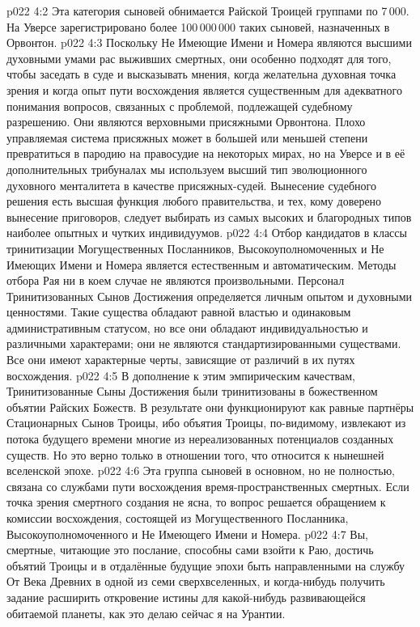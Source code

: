\vs p022 4:2 Эта категория сыновей обнимается Райской Троицей группами по 7\,000. На Уверсе зарегистрировано более 100\,000\,000 таких сыновей, назначенных в Орвонтон.
\vs p022 4:3 Поскольку Не Имеющие Имени и Номера являются высшими духовными умами рас выживших смертных, они особенно подходят для того, чтобы заседать в суде и высказывать мнения, когда желательна духовная точка зрения и когда опыт пути восхождения является существенным для адекватного понимания вопросов, связанных с проблемой, подлежащей судебному разрешению. Они являются верховными присяжными Орвонтона. Плохо управляемая система присяжных может в большей или меньшей степени превратиться в пародию на правосудие на некоторых мирах, но на Уверсе и в её дополнительных трибуналах мы используем высший тип эволюционного духовного менталитета в качестве присяжных\hyp{}судей. Вынесение судебного решения есть высшая функция любого правительства, и тех, кому доверено вынесение приговоров, следует выбирать из самых высоких и благородных типов наиболее опытных и чутких индивидуумов.
\vs p022 4:4 \pc Отбор кандидатов в классы тринитизации Могущественных Посланников, Высокоуполномоченных и Не Имеющих Имени и Номера является естественным и автоматическим. Методы отбора Рая ни в коем случае не являются произвольными. Персонал Тринитизованных Сынов Достижения определяется личным опытом и духовными ценностями. Такие существа обладают равной властью и одинаковым административным статусом, но все они обладают индивидуальностью и различными характерами; они не являются стандартизированными существами. Все они имеют характерные черты, зависящие от различий в их путях восхождения.
\vs p022 4:5 В дополнение к этим эмпирическим качествам, Тринитизованные Сыны Достижения были тринитизованы в божественном объятии Райских Божеств. В результате они функционируют как равные партнёры Стационарных Сынов Троицы, ибо объятия Троицы, по\hyp{}видимому, извлекают из потока будущего времени многие из нереализованных потенциалов созданных существ. Но это верно только в отношении того, что относится к нынешней вселенской эпохе.
\vs p022 4:6 Эта группа сыновей в основном, но не полностью, связана со службами пути восхождения время\hyp{}пространственных смертных. Если точка зрения смертного создания не ясна, то вопрос решается обращением к комиссии восхождения, состоящей из Могущественного Посланника, Высокоуполномоченного и Не Имеющего Имени и Номера.
\vs p022 4:7 Вы, смертные, читающие это послание, способны сами взойти к Раю, достичь объятий Троицы и в отдалённые будущие эпохи быть направленными на службу От Века Древних в одной из семи сверхвселенных, и когда\hyp{}нибудь получить задание расширить откровение истины для какой\hyp{}нибудь развивающейся обитаемой планеты, как это делаю сейчас я на Урантии.
